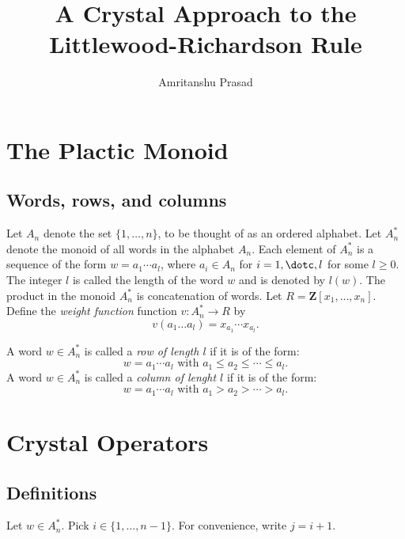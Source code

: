 \documentclass[12pt]{amsart}
\title{A Crystal Approach to the Littlewood-Richardson Rule}
\author{Amritanshu Prasad}
\theoremstyle{definition}
\theoremstyle{example}
\newcommand{\ZZ}{\mathbf Z}
\begin{document}
\section{The Plactic Monoid}
\subsection{Words, rows, and columns}
Let $A_n$ denote the set $\{1,\dotsc,n\}$, to be thought of as an ordered alphabet.
Let $A_n^*$ denote the monoid of all words in the alphabet $A_n$.
Each element of $A_n^*$ is a sequence of the form $w=a_1\dotsb a_l$, where $a_i\in A_n$ for $i=1,\dotc,l$ for some $l\geq 0$.
The integer $l$ is called the length of the word $w$ and is denoted by $l(w)$.
The product in the monoid $A_n^*$ is concatenation of words.
Let $R=\ZZ[x_1,\dotsc,x_n]$.
Define the \emph{weight function} function $v:A_n^*\to R$ by
\begin{displaymath}
  v(a_1\dotsc a_l) = x_{a_1}\dotsb x_{a_l}.
\end{displaymath}

A word $w\in A_n^*$ is called a \emph{row of length $l$} if it is of the form:
\begin{displaymath}
  w = a_1\dotsb a_l \text{ with } a_1\leq a_2\leq \dotsb \leq a_l.
\end{displaymath}
A word $w\in A_n^*$ is called a \emph{column of lenght $l$} if it is of the form:
\begin{displaymath}
  w = a_1\dotsb a_l \text{ with } a_1> a_2> \dotsb > a_l.
\end{displaymath}

\section{Crystal Operators}
\subsection{Definitions}
Let $w\in A_n^*$.
Pick $i\in \{1,\dotsc,n-1\}$.
For convenience, write $j=i+1$.
\end{document}
